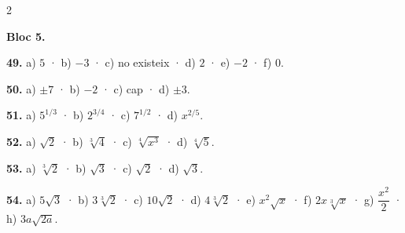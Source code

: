 \documentclass[13pt,a4paper]{extarticle}
\begin{document}
\begin{multicols}{2}
\begin{minipage}{\linewidth}
\textbf{Bloc 5.}\par
\end{minipage}\par\vspace{1.6mm}
\par\noindent\begin{minipage}{\linewidth}
\textbf{49.} a) $5$ · b) $-3$ · c) no existeix · d) $2$ · e) $-2$ · f) $0$.\par
\end{minipage}\par\vspace{1.6mm}
\par\noindent\begin{minipage}{\linewidth}
\textbf{50.} a) $\pm7$ · b) $-2$ · c) cap · d) $\pm3$.\par
\end{minipage}\par\vspace{1.6mm}
\par\noindent\begin{minipage}{\linewidth}
\textbf{51.} a) $5^{1/3}$ · b) $2^{3/4}$ · c) $7^{1/2}$ · d) $x^{2/5}$.\par
\end{minipage}\par\vspace{1.6mm}
\par\noindent\begin{minipage}{\linewidth}
\textbf{52.} a) $\sqrt2$ · b) $\sqrt[3]{4}$ · c) $\sqrt[4]{x^3}$ · d) $\sqrt[4]{5}$.\par
\end{minipage}\par\vspace{1.6mm}
\par\noindent\begin{minipage}{\linewidth}
\textbf{53.} a) $\sqrt[3]{2}$ · b) $\sqrt3$ · c) $\sqrt2$ · d) $\sqrt3$.\par
\end{minipage}\par\vspace{1.6mm}
\par\noindent\begin{minipage}{\linewidth}
\textbf{54.} a) $5\sqrt3$ · b) $3\sqrt[3]{2}$ · c) $10\sqrt2$ · d) $4\sqrt[3]{2}$ · e) $x^2\sqrt x$ · f) $2x\sqrt[3]{x}$ · g) $\dfrac{x^2}{2}$ · h) $3a\sqrt{2a}$.\par
\end{minipage}\par\vspace{1.6mm}

\end{multicols}
\end{document}
